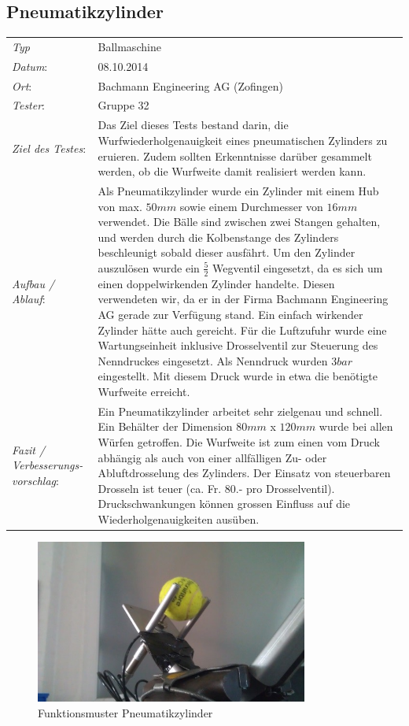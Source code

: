 \subsection{Pneumatikzylinder}

\begin{tabular}{p{3.6cm}p{\textwidth-3.6cm-0.7cm}}
\rule{0pt}{11pt}\textit{Typ}              & Ballmaschine \\ 
\rule{0pt}{11pt}\textit{Datum}:           & 08.10.2014   \\
\rule{0pt}{11pt}\textit{Ort}:             & Bachmann Engineering AG (Zofingen) \\
\rule{0pt}{11pt}\textit{Tester}:          & Gruppe 32\\
\rule{0pt}{11pt}\textit{Ziel des Testes}: & Das Ziel dieses Tests bestand darin, 
die Wurfwiederholgenauigkeit eines pneumatischen Zylinders zu eruieren. Zudem 
sollten Erkenntnisse darüber gesammelt werden, ob die Wurfweite damit realisiert 
werden kann. \\
\rule{0pt}{11pt}\textit{Aufbau / Ablauf}: & Als Pneumatikzylinder wurde ein 
Zylinder mit einem Hub von max. $50 mm$ sowie einem Durchmesser von $16 mm$ 
verwendet. Die Bälle sind zwischen zwei Stangen gehalten, und werden durch die 
Kolbenstange des Zylinders beschleunigt sobald dieser ausfährt. Um den Zylinder 
auszulösen wurde ein $\frac{5}{2}$ Wegventil eingesetzt, da es sich um einen 
doppelwirkenden Zylinder handelte. Diesen verwendeten wir, da er in der Firma 
Bachmann Engineering AG gerade zur Verfügung stand. Ein einfach wirkender 
Zylinder hätte auch gereicht.  Für die Luftzufuhr wurde eine Wartungseinheit 
inklusive Drosselventil zur Steuerung des Nenndruckes eingesetzt. Als Nenndruck 
wurden $3 bar$ eingestellt. Mit diesem Druck wurde in etwa die benötigte 
Wurfweite erreicht.\\
\rule{0pt}{11pt}\textit{Fazit / Verbesserungs-\newline vorschlag}: & Ein 
Pneumatikzylinder arbeitet sehr zielgenau und schnell. Ein Behälter der 
Dimension $80 mm$ x $120 mm$ wurde  bei allen Würfen getroffen. Die Wurfweite 
ist zum einen vom Druck abhängig als auch von einer allfälligen Zu- oder 
Abluftdrosselung des Zylinders. Der Einsatz von steuerbaren Drosseln ist 
teuer (ca. Fr. 80.- pro  Drosselventil). Druckschwankungen können grossen 
Einfluss auf die Wiederholgenauigkeiten ausüben.\\ 
\end{tabular}

\begin{figure}[h!]
	\includegraphics[width=0.8\textwidth]{Funktionstests/Bilder/PneumatikzylinderBild.jpg}
	\centering
	\caption{Funktionsmuster Pneumatikzylinder} 
\label{abb:PneumatikzylinderBild}
\end{figure}